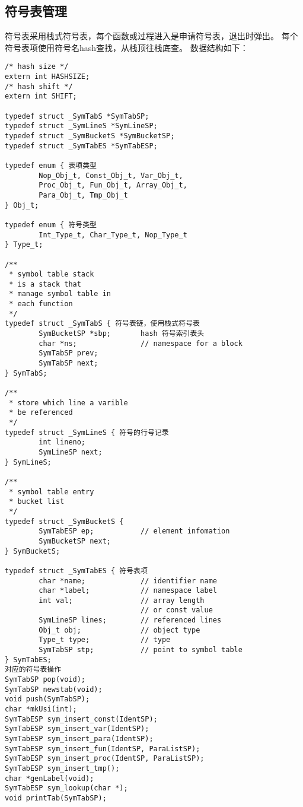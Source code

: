 \subsection{符号表管理}
符号表采用栈式符号表，每个函数或过程进入是申请符号表，退出时弹出。
每个符号表项使用符号名hash查找，从栈顶往栈底查。
数据结构如下：
\begin{verbatim}
/* hash size */
extern int HASHSIZE;
/* hash shift */
extern int SHIFT;

typedef struct _SymTabS *SymTabSP;
typedef struct _SymLineS *SymLineSP;
typedef struct _SymBucketS *SymBucketSP;
typedef struct _SymTabES *SymTabESP;

typedef enum { 表项类型
        Nop_Obj_t, Const_Obj_t, Var_Obj_t,
        Proc_Obj_t, Fun_Obj_t, Array_Obj_t,
        Para_Obj_t, Tmp_Obj_t
} Obj_t;

typedef enum { 符号类型
        Int_Type_t, Char_Type_t, Nop_Type_t
} Type_t;

/**
 * symbol table stack 
 * is a stack that
 * manage symbol table in
 * each function
 */
typedef struct _SymTabS { 符号表链，使用栈式符号表
        SymBucketSP *sbp;       hash 符号索引表头
        char *ns;               // namespace for a block
        SymTabSP prev;
        SymTabSP next;
} SymTabS;

/**
 * store which line a varible
 * be referenced
 */
typedef struct _SymLineS { 符号的行号记录
        int lineno;
        SymLineSP next;
} SymLineS;

/**
 * symbol table entry 
 * bucket list
 */
typedef struct _SymBucketS {
        SymTabESP ep;           // element infomation
        SymBucketSP next;
} SymBucketS;

typedef struct _SymTabES { 符号表项
        char *name;             // identifier name
        char *label;            // namespace label
        int val;                // array length
                                // or const value
        SymLineSP lines;        // referenced lines
        Obj_t obj;              // object type
        Type_t type;            // type 
        SymTabSP stp;           // point to symbol table
} SymTabES;
对应的符号表操作
SymTabSP pop(void);
SymTabSP newstab(void);
void push(SymTabSP);
char *mkUsi(int);
SymTabESP sym_insert_const(IdentSP);
SymTabESP sym_insert_var(IdentSP);
SymTabESP sym_insert_para(IdentSP);
SymTabESP sym_insert_fun(IdentSP, ParaListSP);
SymTabESP sym_insert_proc(IdentSP, ParaListSP);
SymTabESP sym_insert_tmp();
char *genLabel(void);
SymTabESP sym_lookup(char *);
void printTab(SymTabSP);
\end{verbatim}

